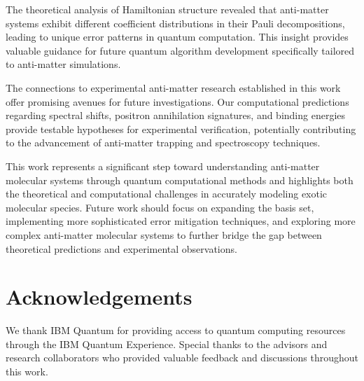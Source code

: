 \documentclass[10pt,twocolumn,a4paper]{article}
\begin{document}
The theoretical analysis of Hamiltonian structure revealed that anti-matter systems exhibit different coefficient distributions in their Pauli decompositions, leading to unique error patterns in quantum computation. This insight provides valuable guidance for future quantum algorithm development specifically tailored to anti-matter simulations.

The connections to experimental anti-matter research established in this work offer promising avenues for future investigations. Our computational predictions regarding spectral shifts, positron annihilation signatures, and binding energies provide testable hypotheses for experimental verification, potentially contributing to the advancement of anti-matter trapping and spectroscopy techniques.

This work represents a significant step toward understanding anti-matter molecular systems through quantum computational methods and highlights both the theoretical and computational challenges in accurately modeling exotic molecular species. Future work should focus on expanding the basis set, implementing more sophisticated error mitigation techniques, and exploring more complex anti-matter molecular systems to further bridge the gap between theoretical predictions and experimental observations.

\section{Acknowledgements}
We thank IBM Quantum for providing access to quantum computing resources through the IBM Quantum Experience. Special thanks to the advisors and research collaborators who provided valuable feedback and discussions throughout this work.



\end{document}
